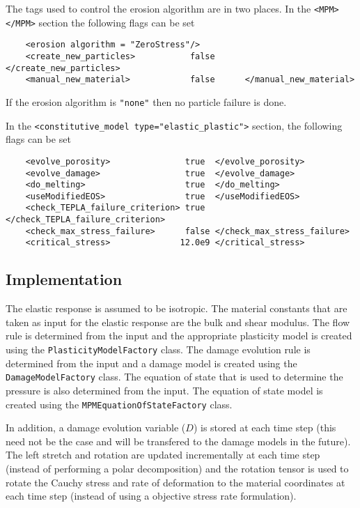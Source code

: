   The tags used to control the erosion algorithm are in two places.  
  In the \verb|<MPM> </MPM>| section the following flags can be set
  \begin{verbatim}
    <erosion algorithm = "ZeroStress"/>
    <create_new_particles>           false      </create_new_particles>
    <manual_new_material>            false      </manual_new_material>
  \end{verbatim}
  If the erosion algorithm is \verb|"none"| then no particle failure is done.

  In the \verb|<constitutive_model type="elastic_plastic">| section, the 
  following flags can be set
  \begin{verbatim}
    <evolve_porosity>               true  </evolve_porosity>
    <evolve_damage>                 true  </evolve_damage>
    <do_melting>                    true  </do_melting>
    <useModifiedEOS>                true  </useModifiedEOS>
    <check_TEPLA_failure_criterion> true  </check_TEPLA_failure_criterion>
    <check_max_stress_failure>      false </check_max_stress_failure>
    <critical_stress>              12.0e9 </critical_stress>
  \end{verbatim}

\subsection{Implementation}
The elastic response is assumed to be isotropic.  The material
constants that are taken as input for the elastic response are the
bulk and shear modulus.  The flow rule is determined from the input
and the appropriate plasticity model is created using the 
\verb+PlasticityModelFactory+ class.  The damage evolution rule
is determined from the input and a damage model is created using
the \verb+DamageModelFactory+ class.  The equation of state 
that is used to determine the pressure is also determined from the
input.  The equation of state model is created using the 
\verb+MPMEquationOfStateFactory+ class.

In addition, a damage evolution variable ($D$) is stored at each time 
step (this need not be the case and will be transfered to the 
damage models in the future).  The left stretch and rotation are 
updated incrementally at each
time step (instead of performing a polar decomposition) and the 
rotation tensor is used to rotate the Cauchy stress and rate of deformation
to the material coordinates at each time step (instead of using a 
objective stress rate formulation).  

